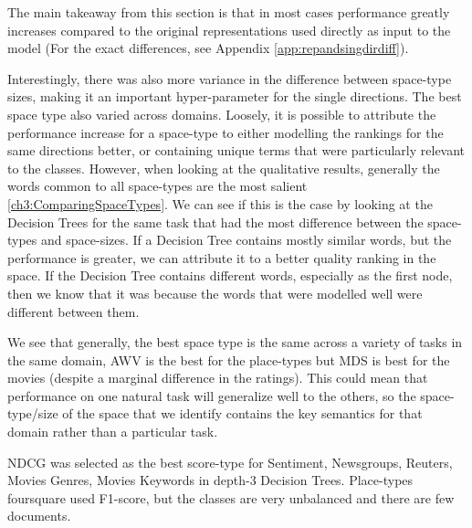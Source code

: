  The main takeaway from this section is that in most cases performance greatly increases compared to the original representations used directly as input to the model (For the exact differences, see Appendix \ref{app:repandsingdirdiff}). 
 
 Interestingly, there was also more variance in the difference between space-type sizes, making it an important hyper-parameter for the single directions. The best space type also varied across domains. Loosely, it is possible to attribute the performance increase for a space-type to either modelling the rankings for the same directions better, or containing unique terms that were particularly relevant to the classes. However, when looking at the qualitative results, generally the words common to all space-types are the most salient \ref{ch3:ComparingSpaceTypes}. We can see if this is the case by looking at the Decision Trees for the same task that had the most difference between the space-types and space-sizes. If a Decision Tree contains mostly similar words, but the performance is greater, we can attribute it to a better quality ranking in the space. If the Decision Tree contains different words, especially as the first node, then we know that it was because the words that were modelled well were different between them. 
 
 We see that generally, the best space type is the same across a variety of tasks in the same domain, AWV is the best for the place-types but MDS is best for the movies (despite a marginal difference in the ratings). This could mean that performance on one natural task will generalize well to the others, so the space-type/size of the space that we identify contains the key semantics for that domain rather than a particular task. 
 
 NDCG was selected as the best score-type for Sentiment, Newsgroups, Reuters, Movies Genres, Movies Keywords in depth-3 Decision Trees. Place-types foursquare used F1-score, but the classes are very unbalanced and there are few documents. 


